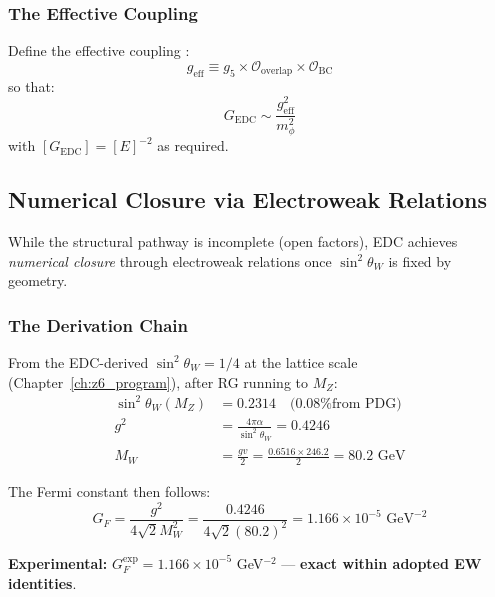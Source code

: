 \subsubsection{The Effective Coupling}

Define the effective coupling \tagP{}:
\begin{equation}
    g_{\text{eff}} \equiv g_5 \times \mathcal{O}_{\text{overlap}}
    \times \mathcal{O}_{\text{BC}}
    \label{eq:ch11_geff}
\end{equation}
so that:
\begin{equation}
    \boxed{
    G_{\text{EDC}} \sim \frac{g_{\text{eff}}^2}{m_\phi^2}
    }
    \label{eq:ch11_GEDC}
\end{equation}
with $[G_{\text{EDC}}] = [E]^{-2}$ as required.

\subsection{Numerical Closure via Electroweak Relations}
\label{sec:ch11_numerical}

While the structural pathway is incomplete (open factors), EDC achieves
\emph{numerical closure} through electroweak relations once $\sin^2\theta_W$ is
fixed by geometry.

\subsubsection{The Derivation Chain}

\begin{theorem}
\label{thm:ch11_GF}
From the EDC-derived $\sin^2\theta_W = 1/4$ at the lattice scale
(Chapter~\ref{ch:z6_program}), after RG running to $M_Z$:
\begin{align}
    \sin^2\theta_W(M_Z) &= 0.2314 \quad \text{(0.08\% from PDG)} \\
    g^2 &= \frac{4\pi\alpha}{\sin^2\theta_W} = 0.4246 \\
    M_W &= \frac{gv}{2} = \frac{0.6516 \times 246.2}{2} = 80.2 \text{ GeV}
\end{align}

The Fermi constant then follows:
\begin{equation}
    \boxed{
    G_F = \frac{g^2}{4\sqrt{2}M_W^2} = \frac{0.4246}{4\sqrt{2}(80.2)^2}
    = 1.166 \times 10^{-5} \text{ GeV}^{-2}
    }
    \label{eq:ch11_GF_derived}
\end{equation}

\textbf{Experimental:} $G_F^{\text{exp}} = 1.166 \times 10^{-5}$ GeV$^{-2}$
\tagBL{} --- \textbf{exact within adopted EW identities}.
\end{theorem}

